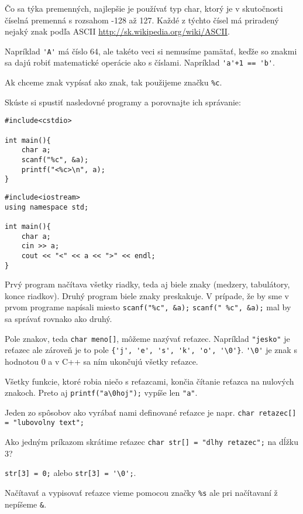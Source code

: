 Čo sa týka premenných, najlepšie je používať typ char, ktorý je v skutočnosti
číselná premenná s rozsahom -128 až 127. Každé z týchto čísel má priradený
nejaký znak podľa ASCII \url{http://sk.wikipedia.org/wiki/ASCII}. 

Napríklad \verb!'A'! má číslo 64, ale takéto veci si nemusíme pamätať,
keďže so znakmi sa dajú robiť matematické operácie ako s číslami. 
Napríklad \verb!'a'+1 == 'b'!.

Ak chceme znak vypísať ako znak, tak použijeme značku \verb!%c!. 

\cvicenie Skúste si spustiť nasledovné programy a porovnajte ich správanie:

\begin{lstlisting}
#include<cstdio>

int main(){
    char a;
    scanf("%c", &a);
    printf("<%c>\n", a);
}
\end{lstlisting}
\begin{lstlisting}
#include<iostream>
using namespace std;

int main(){
    char a;
    cin >> a;
    cout << "<" << a << ">" << endl;
}
\end{lstlisting}

\riesenie Prvý program načítava všetky riadky, teda aj biele znaky
(medzery, tabulátory, konce riadkov). Druhý program biele znaky preskakuje.
V prípade, že by sme v prvom programe napísali miesto \verb!scanf("%c", &a);!
\verb!scanf(" %c", &a);! mal by sa správať rovnako ako druhý.

\medskip

Pole znakov, teda \verb!char meno[]!, môžeme nazývať reťazec. 
Napríklad \verb!"jesko"! je reťazec ale zároveň je to pole
\verb!{'j', 'e', 's', 'k', 'o', '\0'}!. \verb!'\0'! je znak s hodnotou 0
a v C++ sa ním ukončujú všetky reťazce. 

Všetky funkcie, ktoré robia niečo s reťazcami, končia čítanie reťazca
na nulových znakoch. Preto aj \verb!printf("a\0hoj");! vypíše len \verb!"a"!. 

Jeden zo spôsobov ako vyrábať nami definované reťazce je napr.
\verb!char retazec[] = "lubovolny text";!

\cvicenie Ako jedným príkazom skrátime reťazec 
\verb!char str[] = "dlhy retazec";! na dĺžku 3?

\riesenie \verb!str[3] = 0;! alebo \verb!str[3] = '\0';!.

Načítavať a vypisovať reťazce vieme pomocou značky \verb!%s! ale pri načítavaní
ž nepíšeme \verb!&!.


